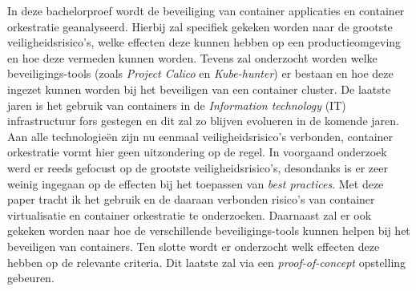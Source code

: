 In deze bachelorproef wordt de beveiliging van container applicaties en container orkestratie geanalyseerd. Hierbij zal specifiek gekeken worden naar de grootste veiligheidsrisico’s, welke effecten deze kunnen hebben op een productieomgeving en hoe deze vermeden kunnen worden. Tevens zal onderzocht worden welke beveiligings-tools (zoals \textit{Project Calico} en \textit{Kube-hunter}) er bestaan en hoe deze ingezet kunnen worden bij het beveiligen van een container cluster. De laatste jaren is het gebruik van containers in de \textit{Information technology} (IT) infrastructuur fors gestegen en dit zal zo blijven evolueren in de komende jaren. Aan alle technologieën zijn nu eenmaal veiligheidsrisico’s verbonden, container orkestratie vormt hier geen uitzondering op de regel. In voorgaand onderzoek werd er reeds gefocust op de grootste veiligheidsrisico’s, desondanks is er zeer weinig ingegaan op de effecten bij het toepassen van \textit{best practices}. Met deze paper tracht ik het gebruik en de daaraan verbonden risico’s van container virtualisatie en container orkestratie te onderzoeken. Daarnaast zal er ook gekeken worden naar hoe de verschillende beveiligings-tools kunnen helpen bij het beveiligen van containers. Ten slotte wordt er onderzocht welk effecten deze hebben op de relevante criteria. Dit laatste zal via een \textit{proof-of-concept} opstelling gebeuren.

